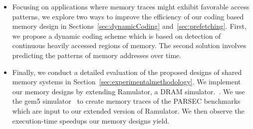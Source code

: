 \begin{itemize}
\item Focusing on applications where memory traces might exhibit favorable access patterns, we explore two ways to improve the efficiency of our coding based memory design in Sections~\ref{sec:dynamicCoding} and~\ref{sec:prefetching}. First, we propose a dynamic coding scheme which is based on detection of continuous heavily accessed regions of memory. 
The second solution involves predicting the patterns of memory addresses over time. 
\item Finally, we conduct a detailed evaluation of the proposed designs of shared memory systems in Section~\ref{sec:experimentalmethodology}. We implement our memory designs by extending Ramulator, a DRAM simulator.~\cite{Ramulator}. We use the gem5 simulator~\cite{parsec_2_1_m5} to create memory traces of the PARSEC benchmarks~\cite{bienia09parsec2} which are input to our extended version of Ramulator. We then observe the execution-time speedups our memory designs yield.%
\end{itemize}

